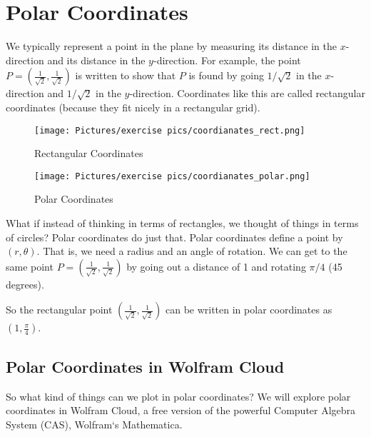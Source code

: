 
\section{Polar Coordinates}

We typically represent a point in the plane by measuring its distance in the $x$-direction and its distance in the $y$-direction. For example, the point $P=\left(\frac{1}{\sqrt{2}},\frac{1}{\sqrt{2}}\right)$ is written to show that $P$ is found by going $1/\sqrt{2}$ in the $x$-direction and $1/\sqrt{2}$ in the $y$-direction. Coordinates like this are called rectangular coordinates (because they fit nicely in a rectangular grid).

\begin{figure}[h]
    \centering
    \begin{minipage}{0.45\textwidth}
        \centering
         \texttt{[image: Pictures/exercise pics/coordianates\_rect.png]}
         \caption{Rectangular Coordinates}
    \label{fig:coordinates_rect}
    \end{minipage}\hfill
    \begin{minipage}{0.45\textwidth}
        \centering
        \texttt{[image: Pictures/exercise pics/coordianates\_polar.png]}
        \caption{Polar Coordinates}
    \label{fig:coordinates_polar}
    \end{minipage}
\end{figure}

\noindent What if instead of thinking in terms of rectangles, we thought of things in terms of circles? Polar coordinates do just that. Polar coordinates define a point by $(r, \theta)$. That is, we need a radius and an angle of rotation. We can get to the same point $P=\left(\frac{1}{\sqrt{2}},\frac{1}{\sqrt{2}}\right)$ by going out a distance of 1 and rotating $\pi/4$ (45 degrees). 

\noindent So the rectangular point $\left(\frac{1}{\sqrt{2}},\frac{1}{\sqrt{2}}\right)$ can be written in polar coordinates as $\left(1,\frac{\pi}{4} \right)$. 

\subsection{Polar Coordinates in Wolfram Cloud}

So what kind of things can we plot in polar coordinates? We will explore polar coordinates in Wolfram Cloud, a free version of the powerful Computer Algebra System (CAS), Wolfram`s Mathematica. 


